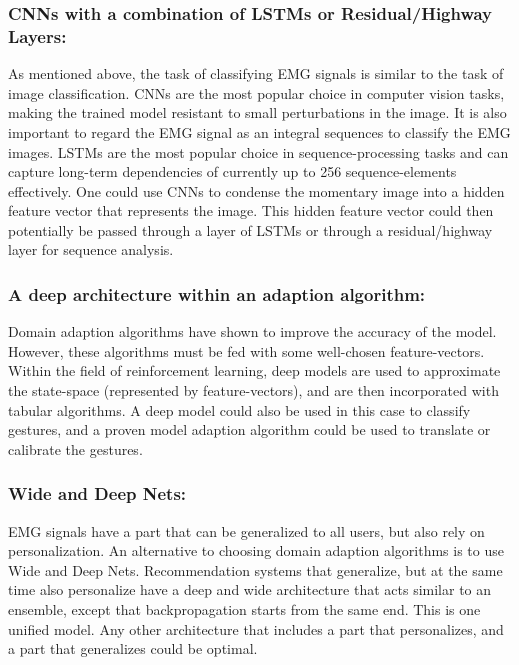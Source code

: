 \documentclass{article}
\begin{document}
\subsubsection{CNNs with a combination of LSTMs or Residual/Highway Layers:} As mentioned above, the task of classifying EMG signals is similar to the task of image classification. CNNs are the most popular choice in computer vision tasks, making the trained model resistant to small perturbations in the image. 
It is also important to regard the EMG signal as an integral sequences to classify the EMG images. LSTMs are the most popular choice in sequence-processing tasks and can capture long-term dependencies of currently up to 256 sequence-elements effectively. 
One could use CNNs to condense the momentary image into a hidden feature vector that represents the image. This hidden feature vector could then potentially be passed through a layer of LSTMs or through a residual/highway layer for sequence analysis.

\subsubsection{A deep architecture within an adaption algorithm:} Domain adaption algorithms have shown to improve the accuracy of the model. However, these algorithms must be fed with some well-chosen feature-vectors. Within the field of reinforcement learning, deep models are used to approximate the state-space (represented by feature-vectors), and are then incorporated with tabular algorithms. A deep model could also be used in this case to classify gestures, and a proven model adaption algorithm could be used to translate or calibrate the gestures.

\subsubsection{Wide and Deep Nets:} EMG signals have a part that can be generalized to all users, but also rely on personalization. An alternative to choosing domain adaption algorithms is to use Wide and Deep Nets.
Recommendation systems that generalize, but at the same time also personalize have a deep and wide architecture that acts similar to an ensemble, except that backpropagation starts from the same end. This is one unified model. Any other architecture that includes a part that personalizes, and a part that generalizes could be optimal. 

\newpage
\end{document}
